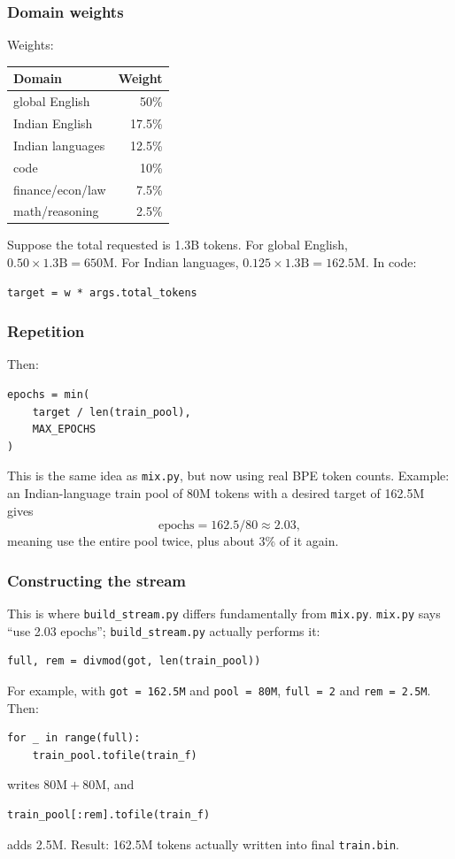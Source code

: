 \subsubsection{Domain weights}

Weights:
\begin{center}
  \renewcommand{\arraystretch}{1.15}
  \small
  \begin{tabular}{@{}l r@{}}
    \textbf{Domain} & \textbf{Weight} \\
    \hline
    global English & 50\% \\
    Indian English & 17.5\% \\
    Indian languages & 12.5\% \\
    code & 10\% \\
    finance/econ/law & 7.5\% \\
    math/reasoning & 2.5\%
  \end{tabular}
\end{center}
Suppose the total requested is 1.3B tokens. For global English,
$0.50\times 1.3\text{B}=650\text{M}$. For Indian languages,
$0.125\times 1.3\text{B}=162.5\text{M}$. In code:
\begin{lstlisting}[style=shadedpython]
target = w * args.total_tokens
\end{lstlisting}

\subsubsection{Repetition}

Then:
\begin{lstlisting}[style=shadedpython]
epochs = min(
    target / len(train_pool),
    MAX_EPOCHS
)
\end{lstlisting}
This is the same idea as \texttt{mix.py}, but now using real BPE token counts.
Example: an Indian-language train pool of 80M tokens with a desired target of
162.5M gives
\[
  \text{epochs}=162.5/80\approx 2.03,
\]
meaning use the entire pool twice, plus about 3\% of it again.

\subsubsection{Constructing the stream}

This is where \texttt{build\_stream.py} differs fundamentally from
\texttt{mix.py}.
\texttt{mix.py} says ``use 2.03 epochs''; \texttt{build\_stream.py} actually
performs it:
\begin{lstlisting}[style=shadedpython]
full, rem = divmod(got, len(train_pool))
\end{lstlisting}
For example, with \texttt{got = 162.5M} and \texttt{pool = 80M},
\texttt{full = 2} and \texttt{rem = 2.5M}. Then:
\begin{lstlisting}[style=shadedpython]
for _ in range(full):
    train_pool.tofile(train_f)
\end{lstlisting}
writes $80\text{M}+80\text{M}$, and
\begin{lstlisting}[style=shadedpython]
train_pool[:rem].tofile(train_f)
\end{lstlisting}
adds 2.5M. Result: 162.5M tokens actually written into final
\texttt{train.bin}.

